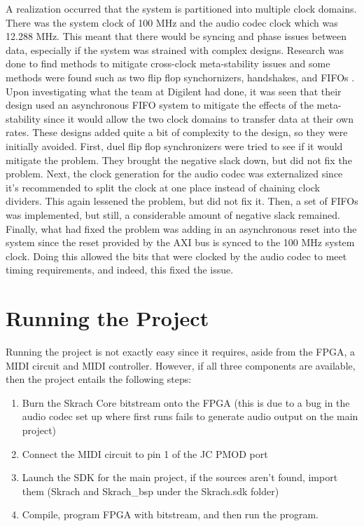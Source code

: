 \documentclass[12pt]{article}
\begin{document}
A realization occurred that the system is partitioned into multiple clock domains. There was the system clock of 100 MHz and the audio codec clock which was 12.288 MHz. This meant that there would be syncing and phase issues between data, especially if the system was strained with complex designs. Research was done to find methods to mitigate cross-clock meta-stability issues and some methods were found such as two flip flop synchornizers, handshakes, and FIFOs \cite{edn_2014}. Upon investigating what the team at Digilent had done, it was seen that their design used an asynchronous FIFO system to mitigate the effects of the meta-stability since it would allow the two clock domains to transfer data at their own rates. These designs added quite a bit of complexity to the design, so they were initially avoided. First, duel flip flop synchronizers were tried to see if it would mitigate the problem. They brought the negative slack down, but did not fix the problem. Next, the clock generation for the audio codec was externalized since it's recommended to split the clock at one place instead of chaining clock dividers. This again lessened the problem, but did not fix it. Then, a set of FIFOs was implemented, but still, a considerable amount of negative slack remained. Finally, what had fixed the problem was adding in an asynchronous reset into the system since the reset provided by the AXI bus is synced to the 100 MHz system clock. Doing this allowed the bits that were clocked by the audio codec to meet timing requirements, and indeed, this fixed the issue.

\section{Running the Project}

Running the project is not exactly easy since it requires, aside from the FPGA, a MIDI circuit and MIDI controller. However, if all three components are available, then the project entails the following steps:

\begin{enumerate}
    \item Burn the Skrach Core bitstream onto the FPGA (this is due to a bug in the audio codec set up where first runs fails to generate audio output on the main project)
    \item Connect the MIDI circuit to pin 1 of the JC PMOD port
    \item Launch the SDK for the main project, if the sources aren't found, import them (Skrach and Skrach\_bsp under the Skrach.sdk folder)
    \item Compile, program FPGA with bitstream, and then run the program.
\end{enumerate}
\end{document}
